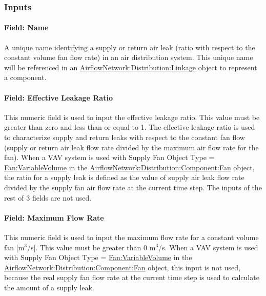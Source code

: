\subsubsection{Inputs}\label{inputs-14-001}

\paragraph{Field: Name}\label{field-name-16-000}

A unique name identifying a supply or return air leak (ratio with respect to the constant volume fan flow rate) in an air distribution system. This unique name will be referenced in an \hyperref[airflownetworkdistributionlinkage]{AirflowNetwork:Distribution:Linkage} object to represent a component.

\paragraph{Field: Effective Leakage Ratio}\label{field-effective-leakage-ratio}

This numeric field is used to input the effective leakage ratio. This value must be greater than zero and less than or equal to 1. The effective leakage ratio is used to characterize supply and return leaks with respect to the constant fan flow (supply or return air leak flow rate divided by the maximum air flow rate for the fan). When a VAV system is used with Supply Fan Object Type = \hyperref[fanvariablevolume]{Fan:VariableVolume} in the \hyperref[airflownetworkdistributioncomponentfan]{AirflowNetwork:Distribution:Component:Fan} object, the ratio for a supply leak is defined as the value of supply air leak flow rate divided by the supply fan air flow rate at the current time step. The inputs of the rest of 3 fields are not used.

\paragraph{Field: Maximum Flow Rate}\label{field-maximum-flow-rate}

This numeric field is used to input the maximum flow rate for a constant volume fan {[}m\(^{3}\)/s{]}. This value must be greater than 0 m\(^{3}\)/s. When a VAV system is used with Supply Fan Object Type = \hyperref[fanvariablevolume]{Fan:VariableVolume} in the \hyperref[airflownetworkdistributioncomponentfan]{AirflowNetwork:Distribution:Component:Fan} object, this input is not used, because the real supply fan flow rate at the current time step is used to calculate the amount of a supply leak.


